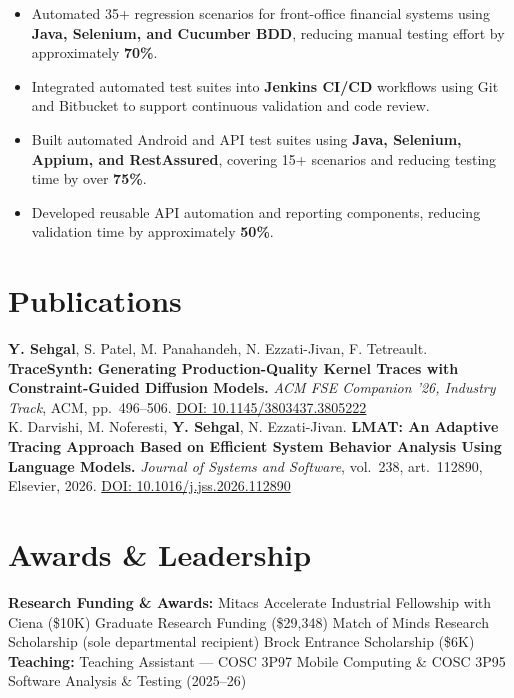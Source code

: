 \documentclass[10pt,letterpaper]{extarticle}
\begin{document}
\begin{itemize}
\item Automated 35+ regression scenarios for front-office financial systems using \textbf{Java, Selenium, and Cucumber BDD}, reducing manual testing effort by approximately \textbf{70\%}.

\item Integrated automated test suites into \textbf{Jenkins CI/CD} workflows using Git and Bitbucket to support continuous validation and code review.

\item Built automated Android and API test suites using \textbf{Java, Selenium, Appium, and RestAssured}, covering 15+ scenarios and reducing testing time by over \textbf{75\%}.

\item Developed reusable API automation and reporting components, reducing validation time by approximately \textbf{50\%}.
\end{itemize}

\section{Publications}

{\small
\textbf{Y. Sehgal}, S. Patel, M. Panahandeh, N. Ezzati-Jivan, F. Tetreault.
\textbf{TraceSynth: Generating Production-Quality Kernel Traces with Constraint-Guided Diffusion Models.}
\textit{ACM FSE Companion '26, Industry Track}, ACM, pp.\ 496--506.
\href{https://doi.org/10.1145/3803437.3805222}{DOI: 10.1145/3803437.3805222}\\[4pt]
K. Darvishi, M. Noferesti, \textbf{Y. Sehgal}, N. Ezzati-Jivan.
\textbf{LMAT: An Adaptive Tracing Approach Based on Efficient System Behavior Analysis Using Language Models.}
\textit{Journal of Systems and Software}, vol.\ 238, art.\ 112890, Elsevier, 2026.
\href{https://doi.org/10.1016/j.jss.2026.112890}{DOI: 10.1016/j.jss.2026.112890}\par
}

\section{Awards \& Leadership}

{\small
\textbf{Research Funding \& Awards:}
Mitacs Accelerate Industrial Fellowship with Ciena (\$10K)
\;\textbullet\;
Graduate Research Funding (\$29,348)
\;\textbullet\;
Match of Minds Research Scholarship (sole departmental recipient)
\;\textbullet\;
Brock Entrance Scholarship (\$6K)\\[2pt]
\textbf{Teaching:}
Teaching Assistant --- COSC 3P97 Mobile Computing \& COSC 3P95 Software Analysis \& Testing (2025--26)\\[2pt]
}
\end{document}
